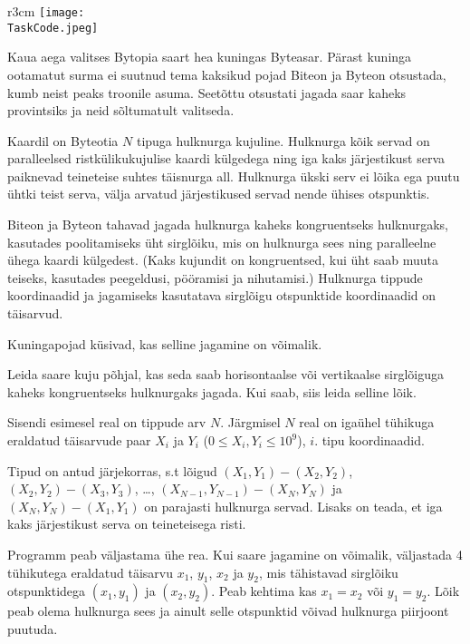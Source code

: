 \documentclass{boi2014-et}
\renewcommand{\TaskCode}{demarcation}
\begin{document}
    \begin{wrapfigure}{r}{3cm}
        \vspace{-24pt}
        \texttt{[image: \\TaskCode.jpeg]}
    \end{wrapfigure}

    Kaua aega valitses Bytopia saart hea kuningas Byteasar.
    Pärast kuninga ootamatut surma ei suutnud tema kaksikud pojad
    Biteon ja Byteon otsustada, kumb neist peaks troonile asuma.
    Seetõttu otsustati jagada saar kaheks provintsiks ja neid
    sõltumatult valitseda.

    Kaardil on Byteotia $N$ tipuga hulknurga kujuline.
    Hulknurga kõik servad on paralleelsed ristkülikukujulise kaardi külgedega ning
    iga kaks järjestikust serva paiknevad teineteise suhtes täisnurga all.
    Hulknurga ükski serv ei lõika ega puutu ühtki teist serva,
    välja arvatud järjestikused servad nende ühises otspunktis.

    Biteon ja Byteon tahavad jagada hulknurga kaheks kongruentseks hulknurgaks,
    kasutades poolitamiseks üht sirglõiku,
    mis on hulknurga sees ning paralleelne ühega kaardi külgedest.
    (Kaks kujundit on kongruentsed, kui üht saab muuta teiseks,
    kasutades peegeldusi, pööramisi ja nihutamisi.)
    Hulknurga tippude koordinaadid ja jagamiseks
    kasutatava sirglõigu otspunktide koordinaadid on täisarvud.

    Kuningapojad küsivad, kas selline jagamine on võimalik.

    \Task

    Leida saare kuju põhjal, kas seda saab horisontaalse või vertikaalse sirglõiguga
    kaheks kongruentseks hulknurgaks jagada.
    Kui saab, siis leida selline lõik.

    \Input

    Sisendi esimesel real on tippude arv $N$.
    Järgmisel $N$ real on igaühel tühikuga eraldatud täisarvude paar
    $X_i$ ja $Y_i$ ($0 \le X_i, Y_i \le 10^9$), $i$. tipu koordinaadid.

    Tipud on antud järjekorras, s.t lõigud $(X_1,Y_1) - (X_2,Y_2)$,
    $(X_2,Y_2) - (X_3,Y_3)$, \ldots, $(X_{N-1},Y_{N-1}) - (X_N,Y_N)$ ja
    $(X_N,Y_N) - (X_1,Y_1)$ on parajasti hulknurga servad.
    Lisaks on teada, et iga kaks järjestikust serva on teineteisega risti.

    \Output

    Programm peab väljastama ühe rea.
    Kui saare jagamine on võimalik, väljastada 4 tühikutega eraldatud täisarvu
    $x_1$, $y_1$, $x_2$ ja $y_2$, mis tähistavad sirglõiku otspunktidega
    $(x_1, y_1)$ ja $(x_2, y_2)$.
    Peab kehtima kas $x_1 = x_2$ või $y_1 = y_2$.
    Lõik peab olema hulknurga sees ja ainult selle otspunktid võivad
    hulknurga piirjoont puutuda.
\end{document}
